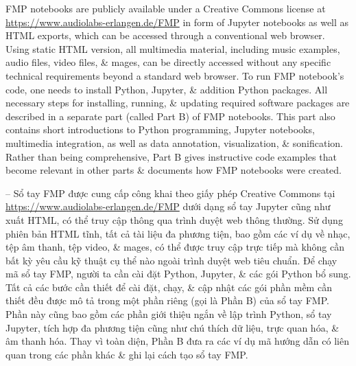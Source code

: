 \documentclass{article}
\begin{document}
\begin{itemize}
	FMP notebooks are publicly available under a Creative Commons license at \url{https://www.audiolabs-erlangen.de/FMP} in form of Jupyter notebooks as well as HTML exports, which can be accessed through a conventional web browser. Using static HTML version, all multimedia material, including music examples, audio files, video files, \& mages, can be directly accessed without any specific technical requirements beyond a standard web browser. To run FMP notebook's code, one needs to install Python, Jupyter, \& addition Python packages. All necessary steps for installing, running, \& updating required software packages are described in a separate part (called Part B) of FMP notebooks. This part also contains short introductions to Python programming, Jupyter notebooks, multimedia integration, as well as data annotation, visualization, \& sonification. Rather than being comprehensive, Part B gives instructive code examples that become relevant in other parts \& documents how FMP notebooks were created.
	
	-- Sổ tay FMP được cung cấp công khai theo giấy phép Creative Commons tại \url{https://www.audiolabs-erlangen.de/FMP} dưới dạng sổ tay Jupyter cũng như xuất HTML, có thể truy cập thông qua trình duyệt web thông thường. Sử dụng phiên bản HTML tĩnh, tất cả tài liệu đa phương tiện, bao gồm các ví dụ về nhạc, tệp âm thanh, tệp video, \& mages, có thể được truy cập trực tiếp mà không cần bất kỳ yêu cầu kỹ thuật cụ thể nào ngoài trình duyệt web tiêu chuẩn. Để chạy mã sổ tay FMP, người ta cần cài đặt Python, Jupyter, \& các gói Python bổ sung. Tất cả các bước cần thiết để cài đặt, chạy, \& cập nhật các gói phần mềm cần thiết đều được mô tả trong một phần riêng (gọi là Phần B) của sổ tay FMP. Phần này cũng bao gồm các phần giới thiệu ngắn về lập trình Python, sổ tay Jupyter, tích hợp đa phương tiện cũng như chú thích dữ liệu, trực quan hóa, \& âm thanh hóa. Thay vì toàn diện, Phần B đưa ra các ví dụ mã hướng dẫn có liên quan trong các phần khác \& ghi lại cách tạo sổ tay FMP.
	

\end{itemize}
\end{document}

